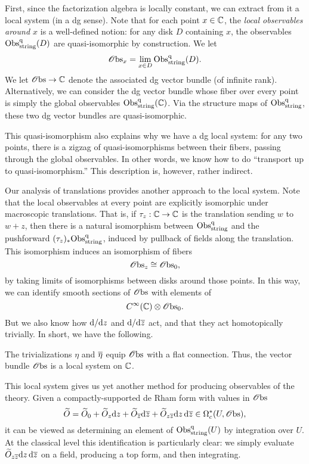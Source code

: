 First, since the factorization algebra is locally constant, 
we can extract from it a local system (in a dg sense).
Note that for each point $x \in \CC$,
the {\em local observables around $x$} is a well-defined notion:
for any disk $D$ containing $x$, the observables $\Obs^\q_{\rm string} (D)$ are quasi-isomorphic by construction.
We let 
\[
\sO{\rm bs}_x = \lim_{x \in D} \Obs^\q_{\rm string} (D).
\]
We let $\sO{\rm bs} \to \CC$ denote the associated dg vector bundle (of infinite rank). 
Alternatively, we can consider the dg vector bundle whose fiber over every point is simply the global observables $\Obs^\q_{\rm string} (\CC)$.
Via the structure maps of $\Obs^\q_{\rm string}$, 
these two dg vector bundles are quasi-isomorphic.

This quasi-isomorphism also explains why we have a dg local system:
for any two points, there is a zigzag of quasi-isomorphisms between their fibers,
passing through the global observables.
In other words, we know how to do ``transport up to quasi-isomorphism.''
This description is, however, rather indirect.

Our analysis of translations provides another approach to the local system.
Note that the local observables at every point are explicitly isomorphic under macroscopic translations.
That is, if $\tau_z: \CC \to \CC$ is the translation sending $w$ to $w+z$,
then there is a natural isomorphism between $\Obs^\q_{\rm string}$ and the pushforward $(\tau_z)_* \Obs^\q_{\rm string}$,
induced by pullback of fields along the translation.
This isomorphism induces an isomorphism of fibers
\[
\sO{\rm bs}_z \cong \sO{\rm bs}_0,
\]
by taking limits of isomorphisms between disks around those points.
In this way, we can identify smooth sections of $\sO{\rm bs}$ with elements of
\[
C^\infty(\CC) \otimes \sO{\rm bs}_0.
\]
But we also know how $\d/\d z$ and $\d/\d\zbar$ act, and that they act homotopically trivially.
In short, we have the following.

\begin{cor} 
The trivializations $\eta$ and $\Bar{\eta}$ equip $\sO{\rm bs}$ with a flat connection. 
Thus, the vector bundle $\sO{\rm bs}$ is a local system on $\CC$.
\end{cor}

This local system gives us yet another method for producing observables of the theory.
Given a compactly-supported de Rham form with values in $\sO{\rm bs}$
\[
\widetilde{O} = \widetilde{O}_0 + \widetilde{O}_z \d z + \widetilde{O}_{\zbar} \d\zbar + \widetilde{O}_{z\zbar} \d z\, \d\zbar \in \Omega^*_c(U,\sO{\rm bs}),
\]
it can be viewed as determining an element of $\Obs^\q_{\rm string}(U)$ by integration over $U$.
At the classical level this identification is particularly clear:
we simply evaluate $\widetilde{O}_{z\zbar} \d z\, \d\zbar$ on a field, producing a top form, and then integrating.

